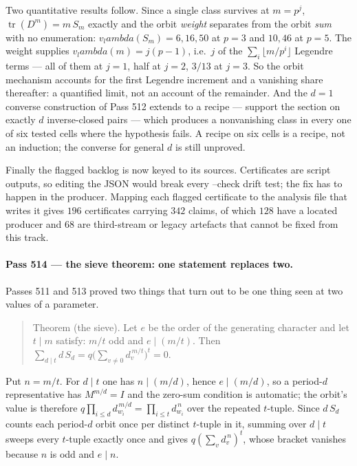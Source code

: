 \documentclass[12pt,a4paper]{article}
\def\textbf#1{#1}%
\def\texttt#1{#1}%
\def\lambda{lambda}%
\theoremstyle{definition}
\begin{document}
Two quantitative results follow.  Since a single class survives at $m=p^{j}$,
$\operatorname{tr}(D^m)=m\,S_m$ exactly and the orbit \emph{weight} separates
from the orbit \emph{sum} with no enumeration: $v_\lambda(S_m)=6,16,50$ at
$p=3$ and $10,46$ at $p=5$.  The weight supplies $v_\lambda(m)=j(p-1)$, i.e.\ $j$ of the
$\sum_i\lfloor m/p^i\rfloor$ Legendre terms --- all of them at $j=1$, half at
$j=2$, $3/13$ at $j=3$.  So the orbit mechanism accounts for the first Legendre
increment and a vanishing share thereafter: a quantified limit, not an account
of the remainder.  And the $d=1$ converse construction of Pass 512 extends to a
recipe --- support the section on exactly $d$ inverse-closed pairs --- which
produces a nonvanishing class in every one of six tested cells where the
hypothesis fails.  A recipe on six cells is a recipe, not an induction; the
converse for general $d$ is still unproved.

Finally the flagged backlog is now keyed to its sources.  Certificates are
script outputs, so editing the JSON would break every \texttt{--check} drift
test; the fix has to happen in the producer.  Mapping each flagged certificate
to the analysis file that writes it gives $196$ certificates carrying $342$
claims, of which $128$ have a located producer and $68$ are third-stream or
legacy artefacts that cannot be fixed from this track.

\paragraph{Pass 514 --- the sieve theorem: one statement replaces two.}
Passes 511 and 513 proved two things that turn out to be one thing seen at two
values of a parameter.

\begin{quote}
\textbf{Theorem (the sieve).}  Let $e$ be the order of the generating character
and let $t\mid m$ satisfy: $m/t$ odd and $e\mid(m/t)$.  Then
$\sum_{d\mid t} d\,S_d = q\bigl(\sum_{v\neq0}d_v^{\,m/t}\bigr)^{t}=0$.
\end{quote}

\noindent Put $n=m/t$.  For $d\mid t$ one has $n\mid(m/d)$, hence
$e\mid(m/d)$, so a period-$d$ representative has $M^{m/d}=I$ and the zero-sum
condition is automatic; the orbit's value is therefore
$q\prod_{i\le d}d_{w_i}^{\,m/d}=\prod_{i\le t}d_{w_i}^{\,n}$ over the repeated
$t$-tuple.  Since $d\,S_d$ counts each period-$d$ orbit once per distinct
$t$-tuple in it, summing over $d\mid t$ sweeps every $t$-tuple exactly once and
gives $q(\sum_v d_v^{\,n})^{t}$, whose bracket vanishes because $n$ is odd and
$e\mid n$.
\end{document}
